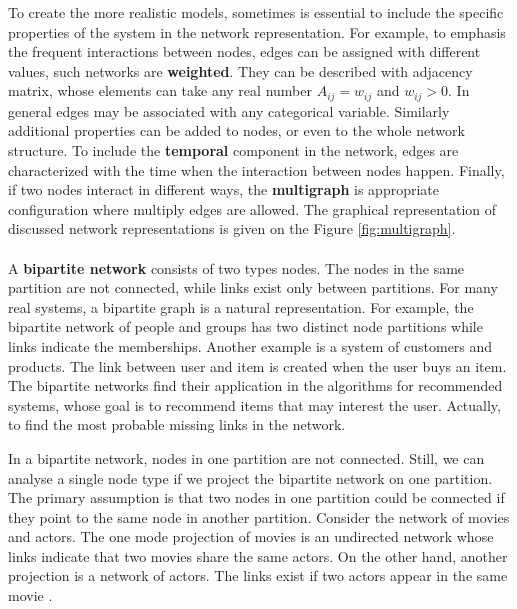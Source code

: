 To create the more realistic models, sometimes is essential to include the specific properties of the system in the network representation. For example, to emphasis the frequent interactions between nodes, edges can be assigned with different values, such networks are \textbf{weighted}. They can be described with adjacency matrix, whose elements can take any real number $A_{ij}=w_{ij}$ and $w_{ij}>0$. In general edges may be associated with any categorical variable. Similarly additional properties can be added to nodes, or even to the whole network structure. To include the \textbf{temporal} component in the network, edges are characterized with the time when the interaction between nodes happen. Finally, if two nodes interact in different ways, the \textbf{multigraph} is appropriate configuration where multiply edges are allowed. The graphical representation of discussed network representations is given on the Figure \ref{fig:multigraph}. \\~\\
A \textbf{bipartite network} consists of two types nodes. The nodes in the same partition are not connected, while links exist only between partitions. For many real systems, a bipartite graph is a natural representation\cite{barabasi2016network, latora2017complex}. For example, the bipartite network of people and groups has two distinct node partitions while links indicate the memberships. Another example is a system of customers and products. The link between user and item is created when the user buys an item. The bipartite networks find their application in the algorithms for recommended systems, whose goal is to recommend items that may interest the user. Actually, to find the most probable missing links in the network. 

In a bipartite network, nodes in one partition are not connected. Still, we can analyse a single node type if we project the bipartite network on one partition. The primary assumption is that two nodes in one partition could be connected if they point to the same node in another partition. Consider the network of movies and actors. The one mode projection of movies is an undirected network whose links indicate that two movies share the same actors. On the other hand, another projection is a network of actors. The links exist if two actors appear in the same movie \cite{newman2010, barabasi2016network}.

